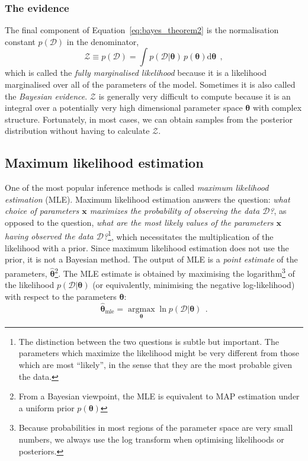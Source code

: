 \documentclass[12pt,dvipsnames]{report}
\renewcommand{\vec}[1]{\boldsymbol{\mathbf{#1}}}
\newcommand{\hquad}{~~}
\begin{document}
\subsubsection{The evidence}
The final component of Equation~\ref{eq:bayes_theorem2} is the normalisation
constant $ p(\mathcal{D})$ in the denominator,
\begin{equation}
    \mathcal{Z}\equiv p(\mathcal{D})=\int p(\mathcal D\lvert\boldsymbol\theta)\,p(\boldsymbol\theta)\textrm{d}\boldsymbol\theta
    \hquad,
    \label{eq:evidence}
\end{equation}
which is called the \emph{fully marginalised likelihood} because
it is a likelihood marginalised over all of the parameters of the model.
Sometimes
it is also called the \emph{Bayesian evidence}.
$\mathcal{Z}$ is generally very difficult to compute because it is an
integral over a potentially very high dimensional parameter space $\vec{\theta}$
with complex structure.
Fortunately, in most cases, we can obtain samples from the posterior distribution without having
to calculate $\mathcal{Z}$.

\subsection{Maximum likelihood estimation}
\label{ssec:maximum_likelihood}
One of the most popular inference methods is called \emph{maximum likelihood
    estimation} (MLE). Maximum likelihood estimation answers the question:
\emph{what choice of parameters $\vec{x}$ maximizes the probability of observing 
the data $\mathcal{D}$?}, as
opposed to the question, \emph{what are the most likely values of the
    parameters $\vec{x}$ having observed the data $\mathcal{D}$?}\footnote{The
    distinction between the two questions is subtle but important. The parameters
    which maximize the likelihood might be very different from those which are most
    ``likely'', in the sense that they are the most probable given the data.}, which necessitates the
multiplication of the likelihood with a prior. Since maximum likelihood estimation does not
use the prior, it is not a Bayesian method. The output of MLE is a \emph{point
    estimate} of the parameters, $\hat{\vec{\theta}}$\footnote{From a Bayesian viewpoint, the
MLE is equivalent to MAP estimation under a uniform prior $p(\vec{\theta})$}.
The MLE estimate is obtained by maximising the logarithm\footnote{Because
    probabilities in most regions of the parameter space are very small numbers, we
    always use the log transform when optimising likelihoods or posteriors.} of the
likelihood $p(\mathcal{D}\lvert\vec{\theta})$ (or equivalently, minimising the
negative log-likelihood) with respect to the parameters $\vec{\theta}$:
\begin{equation}
    \hat{\boldsymbol{\theta}}_{\mathrm{mle}}=\underset{\boldsymbol{\theta}}{\operatorname{argmax}}
    \ln p\left(\mathcal{D}\lvert \boldsymbol{\theta}\right)
    \hquad.
\end{equation}
\end{document}
